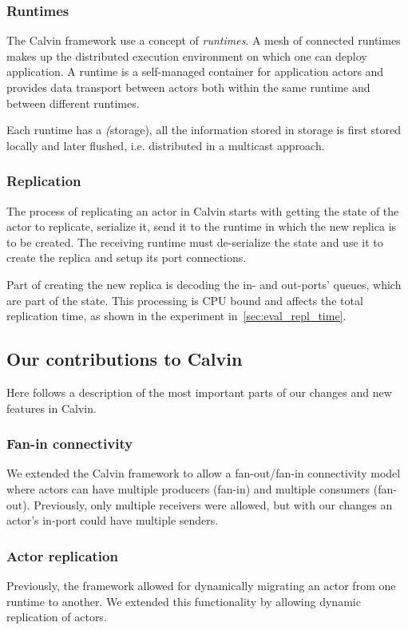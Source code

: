 \documentclass{cslthse-msc}
\begin{document}
\subsubsection{Runtimes} \label{sec:calvin_runtime}
The Calvin framework use a concept of \emph{runtimes}. A mesh of connected runtimes makes up the distributed execution environment on which one can deploy application. A runtime is a self-managed container for application actors and provides data transport between actors both within the same runtime and between different runtimes.

Each runtime has a \emph(storage), all the information stored in storage is first stored locally and later flushed, i.e. distributed in a multicast approach.

\subsubsection{Replication} \label{subsec:calvin_replication}
The process of replicating an actor in Calvin starts with getting the state of the actor to replicate, serialize it, send it to the runtime in which the new replica is to be created. The receiving runtime must de-serialize the state and use it to create the replica and setup its port connections.

Part of creating the new replica is decoding the in- and out-ports' queues, which are part of the state. This processing is CPU bound and affects the total replication time, as shown in the experiment in~\cref{sec:eval_repl_time}.

\subsection{Our contributions to Calvin} \label{subsec:design_contributions} %
Here follows a description of the most important parts of our changes and new features in Calvin.

\subsubsection{Fan-in connectivity}
We extended the Calvin framework to allow a fan-out/fan-in connectivity model where actors can have multiple producers (fan-in) and multiple consumers (fan-out). Previously, only multiple receivers were allowed, but with our changes an actor's in-port could have multiple senders.

\subsubsection{Actor replication}
Previously, the framework allowed for dynamically migrating an actor from one runtime to another. We extended this functionality by allowing dynamic replication of actors. 
\end{document}
